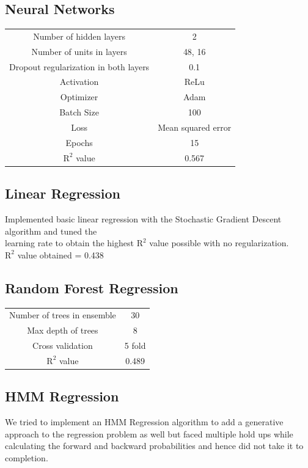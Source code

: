 \documentclass[15pt]{article}
\begin{document}
\subsection{Neural Networks}
\begin{center}
\begin{tabular}{c c}
Number of hidden layers & 2 \\
Number of units in layers & 48, 16 \\
Dropout regularization in both layers & 0.1 \\
Activation & ReLu \\
Optimizer & Adam \\
Batch Size & 100 \\
Loss & Mean squared error \\
Epochs & 15 \\ 
$\text{R}^{2}$ value & 0.567 \\
\end{tabular}
\end{center}
\subsection{Linear Regression}
Implemented basic linear regression with the Stochastic Gradient Descent algorithm and tuned the\\ \hspace*{4.5mm} learning rate to obtain the highest $\text{R}^{2}$ value possible with no regularization.\\
\hspace*{5mm}$\text{R}^{2}$ value obtained = 0.438

\subsection{Random Forest Regression}
\begin{center}
\begin{tabular}{c c}
Number of trees in ensemble & 30 \\
Max depth of trees & 8 \\
Cross validation & 5 fold \\
$\text{R}^{2}$ value & 0.489 \\

\end{tabular}
\end{center}

\subsection{HMM Regression}
We tried to implement an HMM Regression algorithm to add a generative approach to the regression \hspace*{5mm} problem as well but faced multiple hold ups while calculating the forward and backward probabilities \hspace*{5mm} and hence did not take it to completion.
\end{document}
